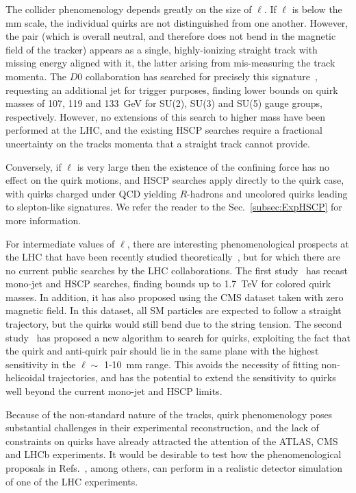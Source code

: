 {The collider phenomenology depends greatly on the size of $\ell$.  If $\ell$ is below the mm scale, the individual quirks are not distinguished from one another. However, the pair (which is overall neutral, and therefore does not bend in the magnetic field of the tracker) appears as a single, highly-ionizing straight track with missing energy aligned with it, the latter arising from mis-measuring the track momenta. The $D0$ collaboration has searched for precisely this signature~\cite{Abazov:2010yb}, requesting an additional jet for trigger purposes, finding lower bounds on quirk masses of 107, 119 and 133~GeV for SU(2), SU(3) and SU(5) gauge groups, respectively. However, no extensions of this search to higher mass have been performed at the LHC, and the existing HSCP searches require a fractional uncertainty on the tracks momenta that a straight track cannot provide.

Conversely, if $\ell$ is very large then the existence of the confining force has no effect on the quirk motions, and HSCP searches apply directly to the quirk case, with quirks charged under QCD yielding $R$-hadrons and uncolored quirks leading to slepton-like signatures. We refer the reader to the Sec.~\ref{subsec:ExpHSCP} for more information.

For intermediate values of $\ell$, there are interesting phenomenological prospects at the LHC that have been recently studied theoretically~\cite{Farina:2017cts,Knapen:2017kly}, but for which there are no current public searches by the LHC collaborations. The first study~\cite{Farina:2017cts} has recast mono-jet and HSCP searches, finding bounds up to 1.7~TeV for colored quirk masses. In addition, it has also proposed using the CMS dataset taken with zero magnetic field. In this dataset, all SM particles are expected to follow a straight trajectory, but the quirks would still bend due to the string tension. The second study~\cite{Knapen:2017kly} has proposed a new algorithm to search for quirks, exploiting the fact that the quirk and anti-quirk pair should lie in the same plane with the highest sensitivity in the $\ell \sim$ 1-10~mm range. This avoids the necessity of fitting non-helicoidal trajectories, and has the potential to extend the sensitivity to quirks well beyond the current mono-jet and HSCP limits.

Because of the non-standard nature of the tracks, quirk phenomenology poses substantial challenges in their experimental reconstruction, and the lack of constraints on quirks have already attracted the attention of the ATLAS, CMS and LHCb experiments. It would be desirable to test how the phenomenological proposals in Refs.~\cite{Farina:2017cts,Knapen:2017kly}, among others, can perform in a realistic detector simulation of one of the LHC experiments.

}
